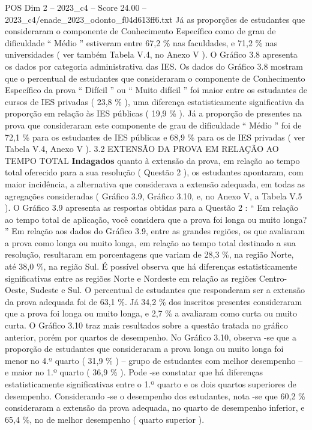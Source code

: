 \begin{textsample}{POS Dim 2 – 2023\_c4 – Score 24.00 – 2023\_c4/enade\_2023\_odonto\_f04d613ff6.txt}
Já as proporções de estudantes que consideraram o componente de Conhecimento Específico como de grau de dificuldade “ Médio ” estiveram entre 67,2 \% nas faculdades, e 71,2 \% nas universidades ( ver também Tabela V.4, no Anexo V ).
O Gráfico 3.8 apresenta os dados por categoria administrativa das IES.
Os dados do Gráfico 3.8 mostram que o percentual de estudantes que consideraram o componente de Conhecimento Específico da prova “ Difícil ” ou “ Muito difícil ” foi maior entre os estudantes de cursos de IES privadas ( 23,8 \% ), uma diferença estatisticamente significativa da proporção em relação às IES públicas ( 19,9 \% ).
Já a proporção de presentes na prova que consideraram este componente de grau de dificuldade “ Médio ” foi de 72,1 \% para os estudantes de IES públicas e 68,9 \% para os de IES privadas ( ver Tabela V.4, Anexo V ). 3.2 EXTENSÃO DA PROVA EM RELAÇÃO AO TEMPO TOTAL \textbf{Indagados} quanto à extensão da prova, em relação ao tempo total oferecido para a sua resolução ( Questão 2 ), os estudantes apontaram, com maior incidência, a alternativa que considerava a extensão adequada, em todas as agregações consideradas ( Gráfico 3.9, Gráfico 3.10, e, no Anexo V, a Tabela V.5 ).
O Gráfico 3.9 apresenta as respostas obtidas para a Questão 2 : “ Em relação ao tempo total de aplicação, você considera que a prova foi longa ou muito longa? ” Em relação aos dados do Gráfico 3.9, entre as grandes regiões, os que avaliaram a prova como longa ou muito longa, em relação ao tempo total destinado a sua resolução, resultaram em porcentagens que variam de 28,3 \%, na região Norte, até 38,0 \%, na região Sul.
É possível observa que há diferenças estatisticamente significativas entre as regiões Norte e Nordeste em relação as regiões Centro-Oeste, Sudeste e Sul.
O percentual de estudantes que responderam ser a extensão da prova adequada foi de 63,1 \%.
Já 34,2 \% dos inscritos presentes consideraram que a prova foi longa ou muito longa, e 2,7 \% a avaliaram como curta ou muito curta.
O Gráfico 3.10 traz mais resultados sobre a questão tratada no gráfico anterior, porém por quartos de desempenho.
No Gráfico 3.10, observa -se que a proporção de estudantes que consideraram a prova longa ou muito longa foi menor no 4.º quarto ( 31,9 \% ) – grupo de estudantes com melhor desempenho – e maior no 1.º quarto ( 36,9 \% ).
Pode -se constatar que há diferenças estatisticamente significativas entre o 1.º quarto e os dois quartos superiores de desempenho.
Considerando -se o desempenho dos estudantes, nota -se que 60,2 \% consideraram a extensão da prova adequada, no quarto de desempenho inferior, e 65,4 \%, no de melhor desempenho ( quarto superior ).

\end{textsample}
